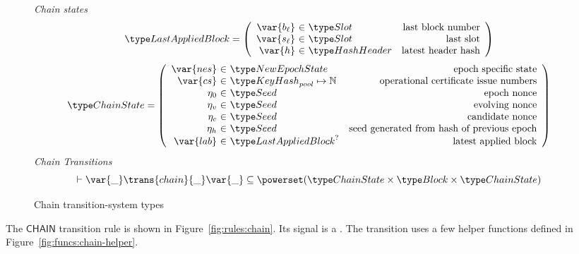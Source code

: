 \begin{figure}
  \emph{Chain states}
  \begin{equation*}
    \LastAppliedBlock =
    \left(
      \begin{array}{r@{~\in~}lr}
        \var{b_\ell} & \Slot & \text{last block number} \\
        \var{s_\ell} & \Slot & \text{last slot} \\
        \var{h} & \HashHeader & \text{latest header hash} \\
      \end{array}
    \right)
  \end{equation*}
  \begin{equation*}
    \ChainState =
    \left(
      \begin{array}{r@{~\in~}lr}
        \var{nes} & \NewEpochState & \text{epoch specific state} \\
        \var{cs} & \KeyHash_{pool} \mapsto \N & \text{operational certificate issue numbers} \\
        ~\eta_0 & \Seed & \text{epoch nonce} \\
        ~\eta_v & \Seed & \text{evolving nonce} \\
        ~\eta_c & \Seed & \text{candidate nonce} \\
        ~\eta_h & \Seed & \text{seed generated from hash of previous epoch} \\
        \var{lab} & \LastAppliedBlock^? & \text{latest applied block} \\
      \end{array}
    \right)
  \end{equation*}
  \emph{Chain Transitions}
  \begin{equation*}
    \vdash \var{\_} \trans{chain}{\_} \var{\_} \subseteq
    \powerset (\ChainState \times \Block \times \ChainState)
  \end{equation*}
  \caption{Chain transition-system types}
  \label{fig:ts-types:chain}
\end{figure}

The $\mathsf{CHAIN}$ transition rule is shown in Figure~\ref{fig:rules:chain}. Its signal is a .
The transition uses a few helper functions defined in Figure~\ref{fig:funcs:chain-helper}.


